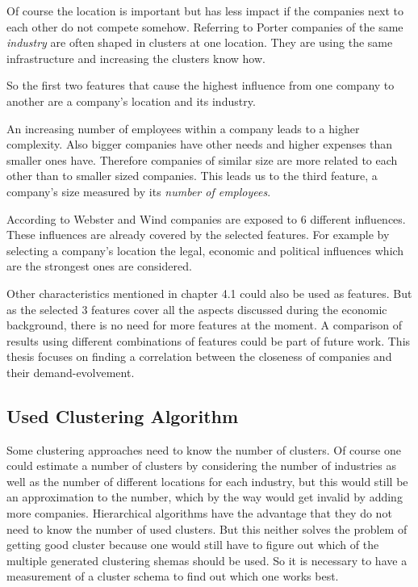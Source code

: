 Of course the location is important but has less impact if the companies next to each other do not compete somehow.
Referring to Porter \cite{CompanyClusters} companies of the same \emph{industry} are often shaped in clusters at one location.
They are using the same infrastructure and increasing the clusters know how.

So the first two features that cause the highest influence from one company to another are a company's location and its industry.

An increasing number of employees within a company leads to a higher complexity. Also bigger companies have other needs and higher expenses than
smaller ones have. Therefore companies of similar size are more related to each other than to smaller sized companies.
This leads us to the third feature, a company's size measured by its \emph{number of employees}.

According to Webster and Wind \cite{BusinessBuyingBehavior} companies are exposed to 6 different influences. These influences are already covered
by the selected features. For example by selecting a company's location the legal, economic and political influences which
are the strongest ones are considered.

Other characteristics mentioned in chapter 4.1 could also be used as features. But as the selected 3 features cover all the aspects
discussed during the economic background, there is no need for more features at the moment. A comparison of results using different combinations of
features could be part of future work. This thesis focuses on finding a correlation between the closeness of companies and their
demand-evolvement.

\subsection{Used Clustering Algorithm}

Some clustering approaches need to know the number of clusters. Of course one could estimate a number of clusters
by considering the number of industries as well as the number of different locations for each industry, but this would
still be an approximation to the number, which by the way would get invalid by adding more companies.
Hierarchical algorithms have the advantage that they do not need to know the number of used clusters. But this neither
solves the problem of getting good cluster because one would still have to figure out which of the multiple generated
clustering shemas should be used. So it is necessary to have a measurement of a cluster schema to find out which one
works best.

